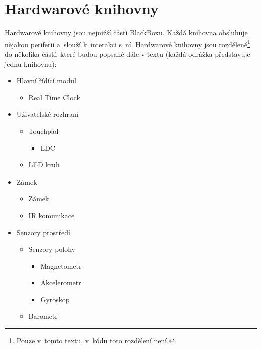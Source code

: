 \chapter{Hardwarové knihovny}
Hardwarové knihovny jsou nejnižší částí BlackBoxu.
Každá knihovna obsluhuje nějakou periferii a~slouží k~interakci s~ní.
Hardwarové knihovny jsou rozdělené\footnote{Pouze v~tomto textu, v~kódu toto rozdělení není.} do několika částí, které budou popsané dále v textu (každá odrážka představuje jednu knihovnu):

\begin{itemize}[noitemsep]
    \item Hlavní řídící modul
          \begin{itemize}[noitemsep]
              \item Real Time Clock
          \end{itemize}
    \item Uživatelské rozhraní
          \begin{itemize}[noitemsep]
              \item Touchpad
                    \begin{itemize}[noitemsep]
                        \item LDC
                    \end{itemize}
              \item LED kruh
          \end{itemize}
    \item Zámek
          \begin{itemize}[noitemsep]
              \item Zámek
              \item IR komunikace
          \end{itemize}
    \item Senzory prostředí
          \begin{itemize}[noitemsep]
              \item Senzory polohy
                    \begin{itemize}[noitemsep]
                        \item Magnetometr
                        \item Akcelerometr
                        \item Gyroskop
                    \end{itemize}
              \item Barometr
          \end{itemize}
\end{itemize}


